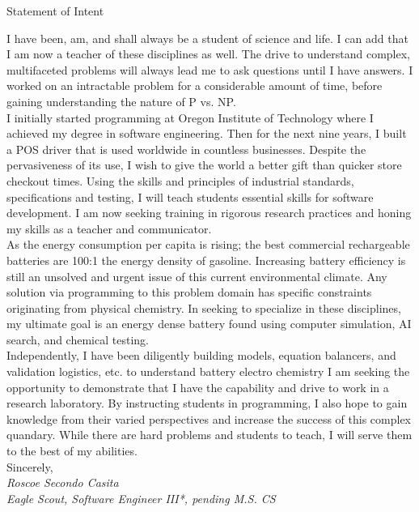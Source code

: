 \documentclass[12pt]{article}
\begin{document}
\begin{center}
	\begin{Huge}
	Statement of Intent
	\end{Huge}
	
\end{center}

\indent I have been, am, and shall always be a student of science and life. I can add that I am now a teacher of these disciplines as well. The drive to understand complex, multifaceted problems will always lead me to ask questions until I have answers. I worked on an intractable problem for a considerable amount of time, before gaining understanding the nature of P vs. NP.  \\

\indent I initially started programming at Oregon Institute of Technology where I achieved my degree in software engineering. Then for the next nine years, I built a POS driver that is used worldwide in countless businesses. Despite the pervasiveness of its use, I wish to give the world a better gift than quicker store checkout times. Using the skills and principles of industrial standards, specifications and testing, I will teach students essential skills for software development. I am now seeking training in rigorous research practices and honing my skills as a teacher and communicator. \\

\indent As the energy consumption per capita is rising; the best commercial rechargeable batteries are 100:1 the energy density of gasoline. Increasing battery efficiency is still an unsolved and urgent issue of this current environmental climate. Any solution via programming to this problem domain has specific constraints originating from physical chemistry. In seeking to specialize in these disciplines, my ultimate goal is an energy dense battery found using computer simulation, AI search, and chemical testing. \\

 \indent Independently, I have been diligently building models, equation balancers, and validation logistics, etc. to understand battery electro chemistry I am seeking the opportunity to demonstrate that I have the capability and drive to work in a research laboratory. By instructing students in programming, I also hope to gain knowledge from their varied perspectives and increase the success of this complex quandary. While there are hard problems and students to teach, I will serve them to the best of my abilities.\\
 
 
\indent Sincerely, \\

\indent \textit{Roscoe Secondo Casita}\\
\indent \textit{Eagle Scout, Software Engineer III*, pending M.S. CS}
\end{document}
